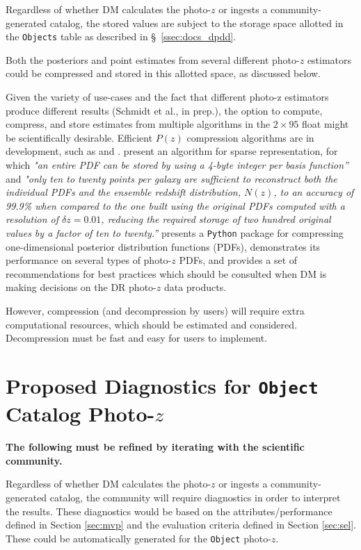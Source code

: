 \documentclass[DM,lsstdraft,toc]{lsstdoc}
\begin{document}
Regardless of whether DM calculates the photo-$z$ or ingests a community-generated catalog, the stored values are subject to the storage space allotted in the {\tt Objects} table as described in \S~\ref{ssec:docs_dpdd}.

Both the posteriors and point estimates from several different photo-$z$ estimators could be compressed and stored in this allotted space, as discussed below.

Given the variety of use-cases and the fact that different photo-z estimators produce different results (Schmidt et al., in prep.), the option to compute, compress, and store estimates from multiple algorithms in the $2\times95$ float might be scientifically desirable.
Efficient $P(z)$ compression algorithms are in development, such as \citet{2014MNRAS.441.3550C} and \citet{2018AJ....156...35M}.
\citet{2014MNRAS.441.3550C} present an algorithm for sparse representation, for which {\it "an entire PDF can be stored by using a 4-byte integer per basis function''} and {\it "only ten to twenty points per galaxy are sufficient to reconstruct both the individual PDFs and the ensemble redshift distribution, $N(z)$, to an accuracy of 99.9\% when compared to the one built using the original PDFs computed with a resolution of $\delta z = 0.01$, reducing the required storage of two hundred original values by a factor of ten to twenty.''} 
\citet{2018AJ....156...35M} presents a {\tt Python} package for compressing one-dimensional posterior distribution functions (PDFs), demonstrates its performance on several types of photo-$z$ PDFs, and provides a set of recommendations for best practices which should be consulted when DM is making decisions on the DR photo-$z$ data products.

However, compression (and decompression by users) will require extra computational resources, which should be estimated and considered.
Decompression must be fast and easy for users to implement.



\clearpage
\section{Proposed Diagnostics for {\tt Object} Catalog Photo-$z$} \label{sec:diagnostics}

{\bf The following must be refined by iterating with the scientific community.}

Regardless of whether DM calculates the photo-$z$ or ingests a community-generated catalog, the community will require diagnostics in order to interpret the results.
These diagnostics would be based on the attributes/performance defined in Section \ref{sec:mvp} and the evaluation criteria defined in Section \ref{sec:sel}. 
These could be automatically generated for the {\tt Object} photo-$z$.
\end{document}
